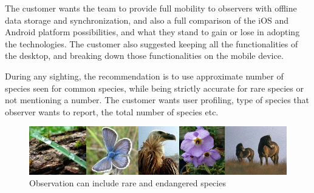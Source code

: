 The customer wants the team to provide full mobility to observers with offline data storage  and synchronization, and also a full comparison of the iOS and Android platform possibilities, and what they stand to gain or lose in adopting the technologies. The customer also suggested keeping all the functionalities of the desktop, and breaking down those functionalities on the mobile device.\newline

During any sighting, the recommendation is to use approximate number of species seen for common species, while being strictly accurate for rare species or not mentioning a number. The customer wants user profiling, type of species that observer wants to report, the total number of species etc.

\begin{figure}[htb]
	\centering
	\includegraphics[width=1\textwidth]{prestudy/field_study/flora_fauna_Nikola.jpg}
	\caption{Observation can include rare and endangered species}
	\label{fig:field_study_species}
\end{figure}


